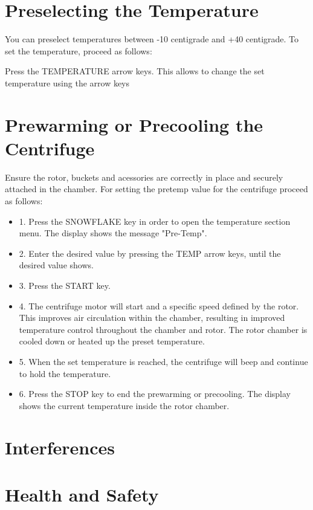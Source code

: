 \documentclass[12pt]{../SOP3_beta}
\begin{document}
\section{Preselecting the Temperature}

\NP You can preselect temperatures between -10 centigrade and +40 centigrade. To set the temperature, proceed as follows:

\NP Press the TEMPERATURE arrow keys. This allows to change the set temperature using the arrow keys 

\section{Prewarming or Precooling the Centrifuge}

\NP Ensure the rotor, buckets and acessories are correctly in place and securely attached in the chamber. For setting the pretemp value for the centrifuge proceed as follows: 

\begin{itemize}
  \item 1. Press the SNOWFLAKE key in order to open the temperature section menu. The display shows the message "Pre-Temp".
  \item 2. Enter the desired value by pressing the TEMP arrow keys, until the desired value shows.
  \item 3. Press the START key.
  \item 4. The centrifuge motor will start and a specific speed defined by the rotor. This improves air circulation within the chamber, resulting in improved temperature control throughout the chamber and rotor. The rotor chamber is cooled down or heated up the preset temperature. 
  \item 5. When the set temperature is reached, the centrifuge will beep and continue to hold the temperature.  
  \item 6. Press the STOP key to end the prewarming or precooling. The display shows the current temperature inside the rotor chamber. 
\end{itemize}

\section{Interferences}

\section{Health and Safety}
\end{document}
